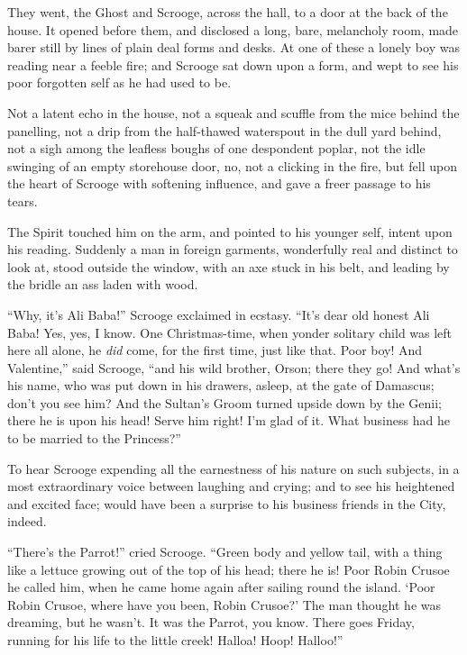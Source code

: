 \documentclass[paper=5.5in:8.5in,BCOR=7mm,twoside,DIV=calc,12pt,usegeometry]{scrbook} %
\begin{document}
They went, the Ghost and Scrooge, across the hall, to a door at the back of the house. It opened before them, and disclosed a long, bare, melancholy room, made barer still by lines of plain deal forms and desks. At one of these a lonely boy was reading near a feeble fire; and Scrooge sat down upon a form, and wept to see his poor forgotten self as he had used to be.

Not a latent echo in the house, not a squeak and scuffle from the mice behind the panelling, not a drip from the half-thawed waterspout in the dull yard behind, not a sigh among the leafless boughs of one despondent poplar, not the idle swinging of an empty storehouse door, no, not a clicking in the fire, but fell upon the heart of Scrooge with softening influence, and gave a freer passage to his tears.

The Spirit touched him on the arm, and pointed to his younger self, intent upon his reading. Suddenly a man in foreign garments, wonderfully real and distinct to look at, stood outside the window, with an axe stuck in his belt, and leading by the bridle an ass laden with wood.

\enquote{Why, it's Ali Baba!} Scrooge exclaimed in ecstasy. \enquote{It's dear old honest Ali Baba! Yes, yes, I know. One Christmas-time, when yonder solitary child was left here all alone, he \textit{did} come, for the first time, just like that. Poor boy! And Valentine,} said Scrooge, \enquote{and his wild brother, Orson; there they go! And what's his name, who was put down in his drawers, asleep, at the gate of Damascus; don't you see him? And the Sultan's Groom turned upside down by the Genii; there he is upon his head! Serve him right! I'm glad of it. What business had he to be married to the Princess?}

To hear Scrooge expending all the earnestness of his nature on such subjects, in a most extraordinary voice between laughing and crying; and to see his heightened and excited face; would have been a surprise to his business friends in the City, indeed.

\enquote{There's the Parrot!} cried Scrooge. \enquote{Green body and yellow tail, with a thing like a lettuce growing out of the top of his head; there he is! Poor Robin Crusoe he called him, when he came home again after sailing round the island. \enquote{Poor Robin Crusoe, where have you been, Robin Crusoe?} The man thought he was dreaming, but he wasn't. It was the Parrot, you know. There goes Friday, running for his life to the little creek! Halloa! Hoop! Halloo!}
\end{document}
